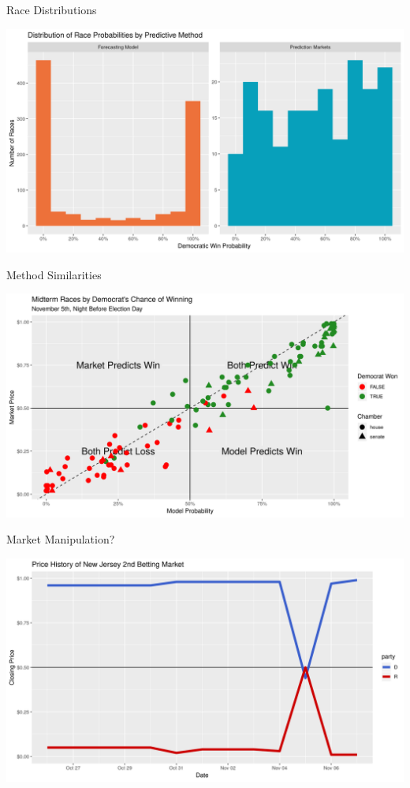 \documentclass[
  ignorenonframetext,
]{beamer}
\begin{document}
\begin{frame}{Race Distributions}
\protect\hypertarget{race-distributions}{}

\includegraphics{../plots/plot_races_hist.png}

\end{frame}

\begin{frame}{Method Similarities}
\protect\hypertarget{method-similarities}{}

\includegraphics{../plots/plot_cart_points.png}

\end{frame}

\begin{frame}{Market Manipulation?}
\protect\hypertarget{market-manipulation}{}

\includegraphics{../plots/plot_nj_02.png}

\end{frame}
\end{document}
